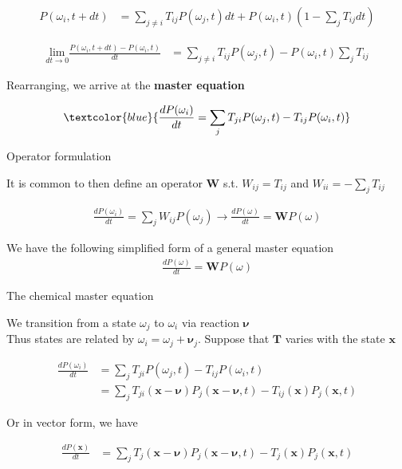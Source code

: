 \documentclass{beamer}					%
\begin{document}
\begin{frame}

\begin{align*}
P(\omega_{i},t+dt) &=  \sum_{j\neq i} T_{ij}P(\omega_{j},t)dt + P(\omega_{i},t)\left(1-\sum_{j}T_{ij}dt\right)
\end{align*}


\begin{align*}
\underset{dt\rightarrow 0}{\mathrm{lim}}\frac{P(\omega_{i},t+dt) - P(\omega_{i},t)}{dt} &=
\sum_{j\neq i} T_{ij}P(\omega_{j},t) - P(\omega_{i},t)\sum_{j}T_{ij}
\end{align*}

Rearranging, we arrive at the \textbf{master equation}

\begin{align*}
\textcolor{blue}{\frac{dP(\omega_{i})}{dt} = \sum_{j}T_{ji}P(\omega_{j},t) - T_{ij}P(\omega_{i},t)}
\end{align*}

\end{frame}


\begin{frame}{Operator formulation}

It is common to then define an operator $\bm{W}$ s.t. $W_{ij} = T_{ij}$ and $W_{ii} = -\sum_{j}T_{ij}$ 

\begin{align*}
\frac{dP(\omega_{i})}{dt} = \sum_{j}W_{ij}P(\omega_{j}) \rightarrow \frac{dP(\omega)}{dt} = \mathbf{W}P(\omega)
\end{align*}


We have the following simplified form of a general master equation
\begin{align*}
\frac{dP(\omega)}{dt} = \mathbf{W}P(\omega)
\end{align*}

\end{frame}

\begin{frame}{The chemical master equation}

We transition from a state $\omega_{j}$ to $\omega_{i}$ via reaction $\bm{\nu}$\\
\vspace{0.1in}
Thus states are related by $\omega_{i} = \omega_{j} + \bm{\nu}_{j}$. Suppose that $\bm{T}$ varies with the state $\bm{x}$

\begin{align*}
\frac{dP(\omega_{i})}{dt} &= \sum_{j}T_{ji}P(\omega_{j},t) - T_{ij}P(\omega_{i},t)\\
&= \sum_{j}T_{ji}(\bm{x}-\bm{\nu})P_{j}(\bm{x}-\bm{\nu},t) - T_{ij}(\bm{x})P_{j}(\bm{x},t)
\end{align*}

Or in vector form, we have

\begin{align*}
\frac{dP(\bm{x})}{dt} &= \sum_{j}T_{j}(\bm{x}-\bm{\nu})P_{j}(\bm{x}-\bm{\nu},t) - T_{j}(\bm{x})P_{j}(\bm{x},t)
\end{align*}

\end{frame}
\end{document}
